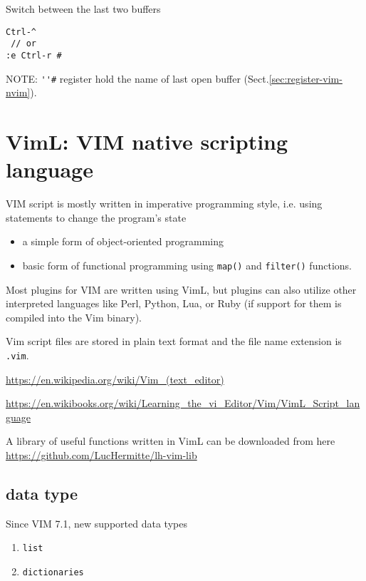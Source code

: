 Switch between the last two buffers
\begin{verbatim}
Ctrl-^
 // or
:e Ctrl-r #
\end{verbatim}
NOTE: \verb!''#! register hold the name of last open buffer
(Sect.\ref{sec:register-vim-nvim}).


\section{VimL: VIM native scripting language}
\label{sec:vim-script}

VIM script is mostly written in imperative programming style, i.e.
using statements to change the program's state
\begin{itemize}
\item a simple form of object-oriented programming
  
  \item basic form of functional programming using \verb!map()! and
  \verb!filter()! functions.
  
\end{itemize}

Most plugins for VIM are written using VimL, but plugins can also utilize other
interpreted languages like Perl, Python, Lua, or Ruby (if support for them is
compiled into the Vim binary).

Vim script files are stored in plain text format and the file name extension is
\verb!.vim!. 

\url{https://en.wikipedia.org/wiki/Vim_(text_editor)}

\url{https://en.wikibooks.org/wiki/Learning_the_vi_Editor/Vim/VimL_Script_language}

A library of useful functions written in VimL can be downloaded from here
\url{https://github.com/LucHermitte/lh-vim-lib}


\subsection{data type}

Since VIM 7.1, new supported data types
\begin{enumerate}
  \item \verb!list!
  
  \item \verb!dictionaries!
\end{enumerate}

